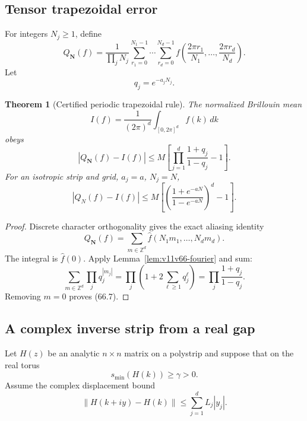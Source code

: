 \documentclass[11pt]{article}
\newtheorem{theorem}{Theorem}[section]
\begin{document}
\subsection{Tensor trapezoidal error}

For integers \(N_j\ge1\), define
\[
 Q_{\boldsymbol N}(f)
 =\frac1{\prod_jN_j}
   \sum_{r_1=0}^{N_1-1}\cdots\sum_{r_d=0}^{N_d-1}
   f\left(\frac{2\pi r_1}{N_1},\ldots,
          \frac{2\pi r_d}{N_d}\right).                        \tag{66.4}
\]
Let
\[
                         q_j=e^{-a_jN_j}.                     \tag{66.5}
\]

\begin{theorem}[Certified periodic trapezoidal rule]
\label{thm:v11v66-trapezoid}
The normalized Brillouin mean
\[
                         I(f)=\frac1{(2\pi)^d}
                                  \int_{[0,2\pi]^d}f(k)\,dk   \tag{66.6}
\]
obeys
\[
 \boxed{
 |Q_{\boldsymbol N}(f)-I(f)|
 \le M\left[
     \prod_{j=1}^d\frac{1+q_j}{1-q_j}-1
        \right].}                                             \tag{66.7}
\]
For an isotropic strip and grid, \(a_j=a\), \(N_j=N\),
\[
 |Q_N(f)-I(f)|
 \le M\left[\left(\frac{1+e^{-aN}}{1-e^{-aN}}\right)^d-1\right].
                                                                  \tag{66.8}
\]
\end{theorem}

\begin{proof}
Discrete character orthogonality gives the exact aliasing identity
\[
                         Q_{\boldsymbol N}(f)
                    =\sum_{m\in\mathbb Z^d}
                         \widehat f(N_1m_1,\ldots,N_dm_d).     \tag{66.9}
\]
The integral is \(\widehat f(0)\).  Apply
Lemma~\ref{lem:v11v66-fourier} and sum:
\[
 \sum_{m\in\mathbb Z^d}
      \prod_jq_j^{|m_j|}
 =\prod_j\left(1+2\sum_{\ell\ge1}q_j^\ell\right)
 =\prod_j\frac{1+q_j}{1-q_j}.                                \tag{66.10}
\]
Removing \(m=0\) proves (66.7).
\end{proof}

\subsection{A complex inverse strip from a real gap}

Let \(H(z)\) be an analytic \(n\times n\) matrix on a polystrip and
suppose that on the real torus
\[
                         s_{\min}(H(k))\ge\gamma>0.            \tag{66.11}
\]
Assume the complex displacement bound
\[
 \lVert H(k+iy)-H(k)\rVert
                  \le\sum_{j=1}^dL_j|y_j|.                   \tag{66.12}
\]
\end{document}
